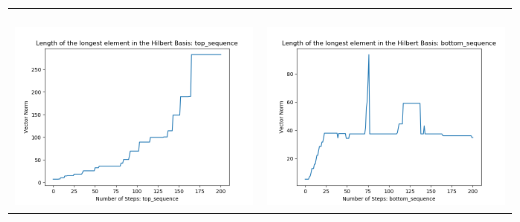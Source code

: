 \documentclass[10pt]{article}
\begin{document}
\begin{tabular}{c|c}
\begin{minipage}{.45\textwidth}
\end{minipage} \\ \\
\hline \\\begin{minipage}{.45\textwidth}
\includegraphics[width=\textwidth]{"DATA/5d/5 generators 2 bound F/top_sequence LENGTH"}
\end{minipage} &
\begin{minipage}{.45\textwidth}
\includegraphics[width=\textwidth]{"DATA/5d/5 generators 2 bound F bottomup/bottom_sequence LENGTH"}
\end{minipage}
\end{tabular}
\end{document}
